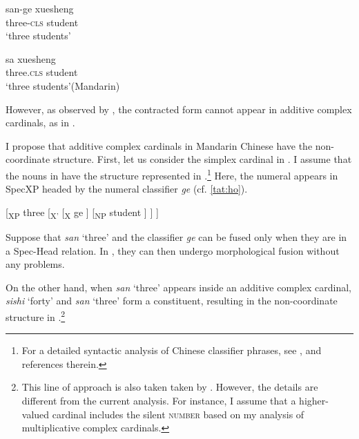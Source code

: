 \documentclass[output=paper]{langscibook}
\begin{document}
\ea\label{tat:ex:chi.contraction.simple}
\ea\label{tat:}
\gll san-ge xuesheng\\  
      three-\textsc{cls} student\\ 
\glt `three students'

\ex\label{tat:sa}
\gll sa xuesheng\\  
      three.\textsc{cls} student\\ 
\glt  `three students'\hfill(Mandarin)
\z\z


\noindent However, as observed by \citet{He2015}, the contracted form cannot appear in additive complex cardinals, as in . 


\ea\label{tat:ex:chi.contraction.mul}
\z\z


\noindent I propose that additive complex cardinals in Mandarin Chinese have the non-coordinate structure. First, let us consider the simplex cardinal in . I assume that the nouns in  have the structure represented in .\footnote{For a detailed syntactic analysis of Chinese classifier phrases, see \citet{Zhang2013}, \citet{HuangOchi2014} and references therein.} Here, the numeral  appears in SpecXP headed by the numeral classifier \textit{ge} (cf. \ref{tat:ho}).

\ea\label{tat:ex:chi.contraction.st1}
{[}\textsubscript{XP} three [\textsubscript{X'} [\textsubscript{X} ge ] [\textsubscript{NP} student ] ] ]
\z

\noindent Suppose that \textit{san} `three' and the classifier \textit{ge} can be fused only when they are in a Spec-Head relation. In , they can then undergo morphological fusion without any problems. 

On the other hand, when \textit{san} `three' appears inside an additive complex cardinal, \textit{sishi} `forty' and \textit{san} `three' form a constituent, resulting in the non-co\-or\-di\-nate structure in .\footnote{This line of approach is also taken taken by \citet{He2015}. However, the details are different from the current analysis. For instance, I assume that a higher-valued cardinal includes the silent \textsc{number} based on my analysis of multiplicative complex cardinals.}
\end{document}
